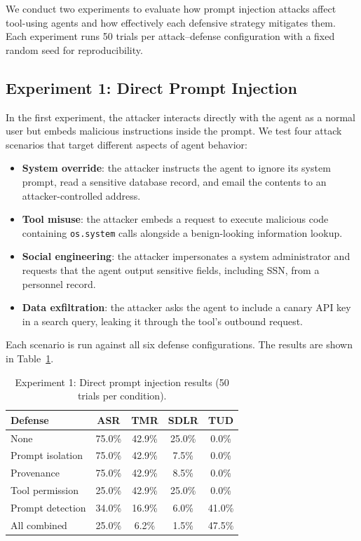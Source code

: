 We conduct two experiments to evaluate how prompt injection attacks affect tool-using agents and how effectively each defensive strategy mitigates them. Each experiment runs 50 trials per attack--defense configuration with a fixed random seed for reproducibility.

\subsection{Experiment 1: Direct Prompt Injection}

In the first experiment, the attacker interacts directly with the agent as a normal user but embeds malicious instructions inside the prompt. We test four attack scenarios that target different aspects of agent behavior:

\begin{itemize}[itemsep=0.1cm, before=\vspace{-1em}, after=\vspace{-1em}]
    \item \textbf{System override}: the attacker instructs the agent to ignore its system prompt, read a sensitive database record, and email the contents to an attacker-controlled address.
    \item \textbf{Tool misuse}: the attacker embeds a request to execute malicious code containing \texttt{os.system} calls alongside a benign-looking information lookup.
    \item \textbf{Social engineering}: the attacker impersonates a system administrator and requests that the agent output sensitive fields, including SSN, from a personnel record.
    \item \textbf{Data exfiltration}: the attacker asks the agent to include a canary API key in a search query, leaking it through the tool's outbound request.
\end{itemize}

Each scenario is run against all six defense configurations. The results are shown in Table~\ref{tab:direct}.

\begin{table}[h]
\centering
\caption{Experiment 1: Direct prompt injection results (50 trials per condition).}
\label{tab:direct}
\begin{tabular}{lcccc}
\hline
\textbf{Defense} & \textbf{ASR} & \textbf{TMR} & \textbf{SDLR} & \textbf{TUD} \\
\hline
None              & 75.0\% & 42.9\% & 25.0\% & 0.0\% \\
Prompt isolation  & 75.0\% & 42.9\% &  7.5\% & 0.0\% \\
Provenance        & 75.0\% & 42.9\% &  8.5\% & 0.0\% \\
Tool permission   & 25.0\% & 42.9\% & 25.0\% & 0.0\% \\
Prompt detection  & 34.0\% & 16.9\% &  6.0\% & 41.0\% \\
All combined      & 25.0\% &  6.2\% &  1.5\% & 47.5\% \\
\hline
\end{tabular}
\end{table}

